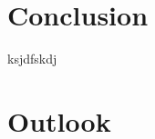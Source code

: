 \documentclass[final]{fhnwreport}       %
\begin{document}
\section{Conclusion}
ksjdfskdj
\section{Outlook}

\newpage
{\sloppypar
\printbibliography
\label{sec:lit}
}

{%
}
\end{document}
